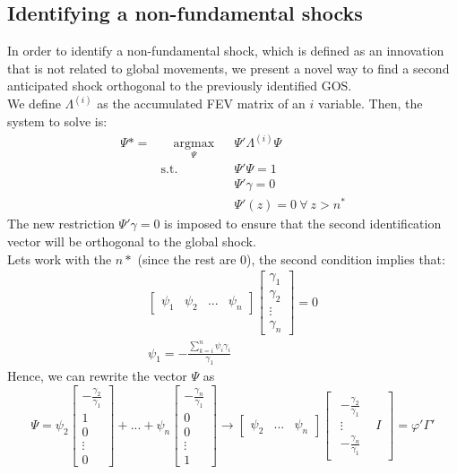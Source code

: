 \documentclass[12pt, a4paper]{article}
\begin{document}
\subsection{Identifying a non-fundamental shocks}
In order to identify a non-fundamental shock, which is defined as an innovation that is not related to global movements, we present a novel way to find a second anticipated shock orthogonal to the previously identified GOS. \\
We define $\Lambda^{(i)}$ as the accumulated FEV matrix of an $i$ variable. Then, the system to solve is:
\begin{equation*}
\begin{aligned}
\Psi* =  & \quad \underset{\Psi}{\text{argmax}}
& & \Psi' \Lambda^{(i)} \Psi \\
& \text{s.t.}
& & \Psi' \Psi = 1\\
& & & \Psi'\gamma = 0 \\
& & & \Psi'(z) = 0 \ \forall \ z > n^*
\end{aligned}
\end{equation*}
The new restriction $\Psi' \gamma = 0$ is imposed to ensure that the second identification vector will be orthogonal to the global shock.\\
Lets work with the $n*$ (since the rest are 0), the second condition implies that:
\begin{align*}
	\begin{bmatrix}
		\psi_1 & \psi_2 & ... &\psi_n
	\end{bmatrix}
	\begin{bmatrix}
		\gamma_1 \\ \gamma_2 \\ \vdots \\ \gamma_n
	\end{bmatrix} = 0 \\
	\psi_1 = -\frac{\sum_{k=i}^{n}\psi_i\gamma_i}{\gamma_1}
\end{align*}
Hence, we can rewrite the vector $\Psi$ as
\begin{equation*}
	\Psi = \psi_2 	\begin{bmatrix}
						-\frac{\gamma_2}{\gamma_1} \\ 1 \\ 0 \\ \vdots \\ 0
					\end{bmatrix}
	+ ... + \psi_n
	\begin{bmatrix}
					-\frac{\gamma_n}{\gamma_1} \\ 0 \\ 0 \\ \vdots \\ 1
				\end{bmatrix}
				\rightarrow
	\begin{bmatrix}\psi_2 & ...&\psi_n\end{bmatrix}
	\begin{bmatrix} \begin{matrix} -\frac{\gamma_2}{\gamma_1}\\ \vdots \\ -\frac{\gamma_n}{\gamma_1}\end{matrix} & I \end{bmatrix} = \varphi'\Gamma'
\end{equation*}
\end{document}
